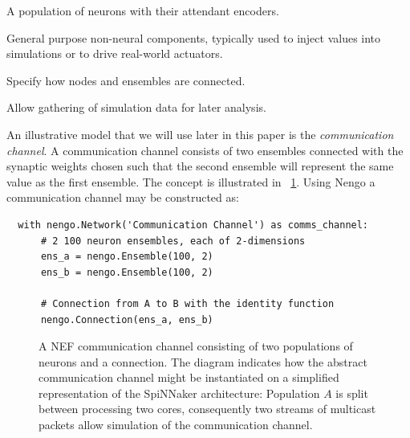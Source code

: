 \documentclass[conference]{IEEEtran}
\begin{document}
  \begin{description}
    \item[Ensembles] A population of neurons with their attendant encoders.
    \item[Nodes] General purpose non-neural components, typically used to inject values into simulations or to drive real-world actuators.
    \item[Connections] Specify how nodes and ensembles are connected.
    \item[Probes] Allow gathering of simulation data for later analysis.
  \end{description}

  An illustrative model that we will use later in this paper is the \textit{communication channel}. A communication channel consists of two ensembles connected with the synaptic weights chosen such that the second ensemble will represent the same value as the first ensemble. The concept is illustrated in \figurename~\ref{fig:background/comms-channel}. Using Nengo a communication channel may be constructed as:

  \begin{lstlisting}
  with nengo.Network('Communication Channel') as comms_channel:
      # 2 100 neuron ensembles, each of 2-dimensions
      ens_a = nengo.Ensemble(100, 2)
      ens_b = nengo.Ensemble(100, 2)

      # Connection from A to B with the identity function
      nengo.Connection(ens_a, ens_b)
  \end{lstlisting}

  \begin{figure}
    \centering
    
    \caption{A NEF communication channel consisting of two populations of neurons and a connection.
    The diagram indicates how the abstract communication channel might be instantiated on a simplified representation of the SpiNNaker architecture:
    Population $A$ is split between processing two cores, consequently two streams of multicast packets allow simulation of the communication channel.
    }
    \label{fig:background/comms-channel}
  \end{figure}
\end{document}
